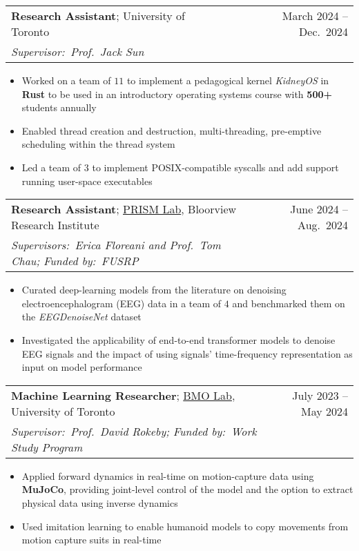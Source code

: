 \documentclass[letterpaper,11pt]{article}
\makeatletter
\newcommand{\resumeItem}[1]{
  \item\small{
    {#1 \vspace{-2pt}}
  }
}
\newcommand{\resumeSubheading}[5]{
  \vspace{-2pt}\item
    \begin{tabular*}{0.97\textwidth}[t]{l@{\extracolsep{\fill}}r}
      \small{\textbf{#1}; {#2}} & \small{#3} \\[-0.05em]
      \emph{\small{#4}} & \textit{\small #5} \\
    \end{tabular*}\vspace{-7pt}
}
\newcommand{\resumeItemListStart}{\begin{itemize}}
\newcommand{\resumeItemListEnd}{\end{itemize}\vspace{-5pt}}
\makeatother
\begin{document}
\resumeSubheading
{Research Assistant}{University of Toronto \href{https://github.com/KidneyOS/KidneyOS}{\footnotesize\faIcon{external-link-alt}}}{\small{March 2024 -- Dec.\ 2024}}
{Supervisor:\ Prof.\ Jack Sun}{}
  \resumeItemListStart
  \resumeItem{Worked on a team of $11$ to implement a pedagogical kernel \emph{KidneyOS} in \textbf{Rust} to be used in an introductory operating systems course with \textbf{500+} students annually}
  \resumeItem{Enabled thread creation and destruction, multi-threading, pre-emptive scheduling within the thread system}
  \resumeItem{Led a team of $3$ to implement POSIX-compatible syscalls and add support running user-space executables}
  \resumeItemListEnd

\resumeSubheading
{Research Assistant}{\href{https://hollandbloorview.ca/research-education/bloorview-research-institute/research-centres-labs/prism-lab}{PRISM Lab}, Bloorview Research Institute}{June 2024 -- Aug.\ 2024}
{Supervisors:\ Erica Floreani and Prof.\ Tom Chau; Funded by:\ FUSRP}{}
  \resumeItemListStart
  \resumeItem{Curated deep-learning models from the literature on denoising electroencephalogram (EEG) data in a team of $4$ and benchmarked them on the \emph{EEGDenoiseNet} dataset}
  \resumeItem{Investigated the applicability of end-to-end transformer models to denoise EEG signals and the impact of using signals' time-frequency representation as input on model performance}
  \resumeItemListEnd

\resumeSubheading
{Machine Learning Researcher}{\href{https://bmolab.artsci.utoronto.ca/}{BMO Lab}, University of Toronto \href{https://github.com/ff-zhang/mocap-mujoco}{\footnotesize\faIcon{external-link-alt}}}{July 2023 -- May 2024}
{Supervisor:\ Prof.\ David Rokeby; Funded by:\ Work Study Program}{}
  \resumeItemListStart
  \resumeItem{Applied forward dynamics in real-time on motion-capture data using \textbf{MuJoCo}, providing joint-level control of the model and the option to extract physical data using inverse dynamics}
  \resumeItem{Used imitation learning to enable humanoid models to copy movements from motion capture suits in real-time}
  \resumeItemListEnd
\end{document}
